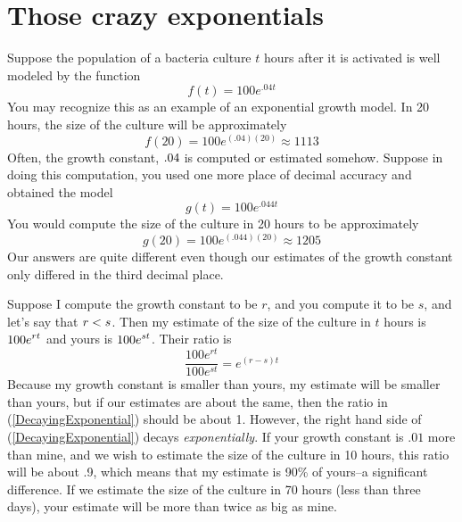 



\section*{Those crazy exponentials}

Suppose the population of a bacteria culture $t$ hours after it is activated is well modeled by the function 
\[
  f(t) = 100 e^{.04 t}
\]
You may recognize this as an example of an exponential growth model. In 20 hours, the size of the culture will be approximately
\[
  f(20) = 100 e^{(.04)(20)} \approx 1113
\]
Often, the growth constant, $\displaystyle .04$ is computed or estimated somehow. Suppose in doing this computation, you used one more place of decimal accuracy and obtained the model 
\[
  g(t) = 100 e^{.044 t}
\]
You would compute the size of the culture in 20 hours to be approximately
\[
  g(20) = 100 e^{(.044)(20)} \approx 1205
\]
Our answers are quite different even though our estimates of the growth constant only differed in the third decimal place.

Suppose I compute the growth constant to be $r$, and you compute it to be $s$, and let's say that $\displaystyle r<s$. Then my estimate of the size of the culture in $t$ hours is $\displaystyle 100 e^{rt}$ and yours is $\displaystyle 100 e^{s t}$. Their ratio is
\begin{equation} \label{DecayingExponential}
  \frac{100 e^{r t}}{100 e^{st}} = e^{(r-s) t}
\end{equation}
Because my growth constant is smaller than yours, my estimate will be smaller than yours, but if our estimates are about the same, then the ratio in (\ref{DecayingExponential}) should be about 1. However, the right hand side of (\ref{DecayingExponential}) decays \textit{exponentially}. If your growth constant is $.01$ more than mine, and we wish to estimate the size of the culture in 10 hours, this ratio will be about .9, which means that my estimate is 90\% of yours--a significant difference. If we estimate the size of the culture in 70 hours (less than three days), your estimate will be more than twice as big as mine.




